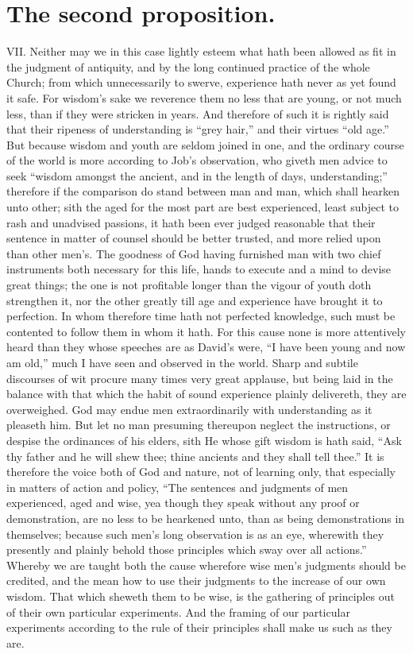 \section*{The second proposition.}
VII. Neither may we in this case lightly esteem what hath been allowed as fit in the judgment of antiquity, and by the long continued practice of the whole Church; from which unnecessarily to swerve, experience hath never as yet found it safe. For wisdom’s sake we reverence them no less that are young, or not much less, than if they were stricken in years. And therefore of such it is rightly said that their ripeness of understanding is “grey hair,” and their virtues “old age.” But because wisdom and youth are seldom joined in one, and the ordinary course of the world is more according to Job’s observation, who giveth men advice to seek “wisdom amongst the ancient, and in the length of days, understanding;” therefore if the comparison do stand between man and man, which shall hearken unto other; sith the aged for the most part are best experienced, least subject to rash and unadvised passions, it hath been ever judged reasonable that their sentence in matter of counsel should be better trusted, and more relied upon than other men’s. The goodness of God having furnished man with two chief instruments both necessary for this life, hands to execute and a mind to devise great things; the one is not profitable longer than the vigour of youth doth strengthen it, nor the other greatly till age and experience have brought it to perfection. In whom therefore time hath not perfected knowledge, such must be contented to follow them in whom it hath. For this cause none is more attentively heard than they whose speeches are as David’s were, “I have been young and now am old,” much I have seen and observed in the world. Sharp and subtile discourses of wit procure many times very great applause, but being laid in the balance with that which the habit of sound experience plainly delivereth, they are overweighed. God may endue men extraordinarily with understanding as it pleaseth him. But let no man presuming thereupon neglect the instructions, or despise the ordinances of his elders, sith He whose gift wisdom is hath said, “Ask thy father and he will shew thee; thine ancients and they shall tell thee.”
It is therefore the voice both of God and nature, not of learning only, that especially in matters of action and policy, “The sentences and judgments of men experienced, aged and wise, yea though they speak without any proof or demonstration, are no less to be hearkened unto, than as being demonstrations in themselves; because such men’s long observation is as an eye, wherewith they presently and plainly behold those principles which sway over all actions.” Whereby we are taught both the cause wherefore wise men’s judgments should be credited, and the mean how to use their judgments to the increase of our own wisdom. That which sheweth them to be wise, is the gathering of principles out of their own particular experiments. And the framing of our particular experiments according to the rule of their principles shall make us such as they are.
